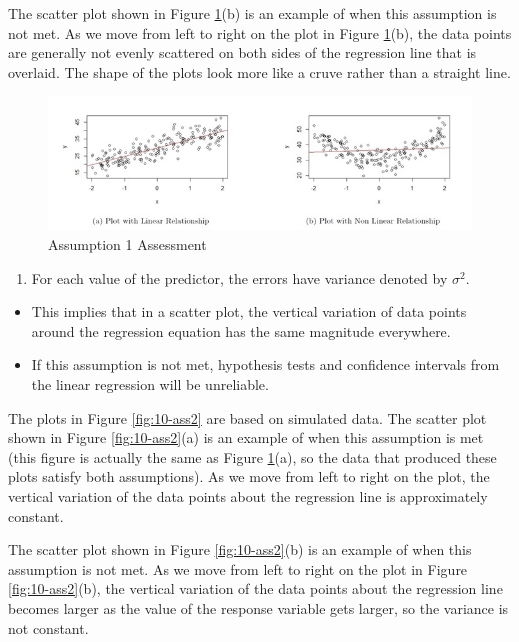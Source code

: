 \documentclass[
]{book}
\providecommand{\tightlist}{%
  \setlength{\itemsep}{0pt}\setlength{\parskip}{0pt}}
\begin{document}
The scatter plot shown in Figure \ref{fig:10-ass1}(b) is an example of when this assumption is not met. As we move from left to right on the plot in Figure \ref{fig:10-ass1}(b), the data points are generally not evenly scattered on both sides of the regression line that is overlaid. The shape of the plots look more like a cruve rather than a straight line.

\begin{figure}
\centering
\includegraphics{images/10-ass1.jpg}
\caption{\label{fig:10-ass1}Assumption 1 Assessment}
\end{figure}

\begin{enumerate}
\def\labelenumi{\arabic{enumi}.}
\setcounter{enumi}{1}
\tightlist
\item
  For each value of the predictor, the errors have variance denoted by \(\sigma^2\).
\end{enumerate}

\begin{itemize}
\tightlist
\item
  This implies that in a scatter plot, the vertical variation of data points around the regression equation has the same magnitude everywhere.
\item
  If this assumption is not met, hypothesis tests and confidence intervals from the linear regression will be unreliable.
\end{itemize}

The plots in Figure \ref{fig:10-ass2} are based on simulated data. The scatter plot shown in Figure \ref{fig:10-ass2}(a) is an example of when this assumption is met (this figure is actually the same as Figure \ref{fig:10-ass1}(a), so the data that produced these plots satisfy both assumptions). As we move from left to right on the plot, the vertical variation of the data points about the regression line is approximately constant.

The scatter plot shown in Figure \ref{fig:10-ass2}(b) is an example of when this assumption is not met. As we move from left to right on the plot in Figure \ref{fig:10-ass2}(b), the vertical variation of the data points about the regression line becomes larger as the value of the response variable gets larger, so the variance is not constant.
\end{document}
